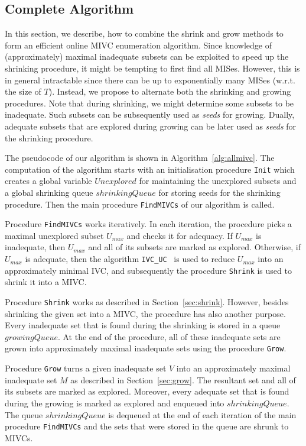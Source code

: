 \subsection{Complete Algorithm}
In this section, we describe, how to combine the shrink and grow methods to form an efficient online MIVC enumeration algorithm.
Since knowledge of (approximately) maximal inadequate subsets can be exploited to speed up the shrinking procedure, it might be tempting to first find all MISes.
However, this is in general intractable since there can be up to exponentially many MISes (w.r.t. the size of $T$).
Instead, we propose to alternate both the shrinking and growing procedures.
Note that during shrinking, we might determine some subsets to be inadequate. Such subsets can be subsequently used as \emph{seeds} for growing.
Dually, adequate subsets that are explored during growing can be later used as \emph{seeds} for the shrinking procedure.

The pseudocode of our algorithm is shown in Algorithm~\ref{alg:allmivc}. The computation of the algorithm starts with an initialisation procedure \texttt{Init} which creates a global variable $\mathit{Unexplored}$ for maintaining the unexplored subsets and a global shrinking queue $\mathit{shrinkingQueue}$ for storing seeds for the shrinking procedure. Then the main procedure \texttt{FindMIVCs} of our algorithm is called.

Procedure \texttt{FindMIVCs} works iteratively. In each iteration, the procedure picks a maximal unexplored subset $U_{max}$ and checks it for adequacy. If $U_{max}$ is inadequate, then $U_{max}$ and all of its subsets are marked as explored. Otherwise, if $U_{max}$ is adequate, then the algorithm \texttt{IVC\_UC}~\cite{Ghass16} is used to reduce $U_{max}$ into an approximately minimal IVC, and subsequently the procedure \texttt{Shrink} is used to shrink it into a MIVC.

Procedure \texttt{Shrink} works as described in Section~\ref{sec:shrink}. However, besides shrinking the given set into a MIVC, the procedure has also another purpose. Every inadequate set that is found during the shrinking is stored in a queue $\mathit{growingQueue}$. At the end of the procedure, all of these inadequate sets are grown into approximately maximal inadequate sets using the procedure \texttt{Grow}.

Procedure \texttt{Grow} turns a given inadequate set $V$ into an approximately maximal inadequate set $M$ as described in Section~\ref{sec:grow}. The resultant set and all of its subsets are marked as explored. Moreover, every adequate set that is found during the growing is marked as explored and enqueued into $\mathit{shrinkingQueue}$.
The queue $\mathit{shrinkingQueue}$ is dequeued at the end of each iteration of the main procedure \texttt{FindMIVCs} and the sets that were stored in the queue are shrunk to MIVCs.


